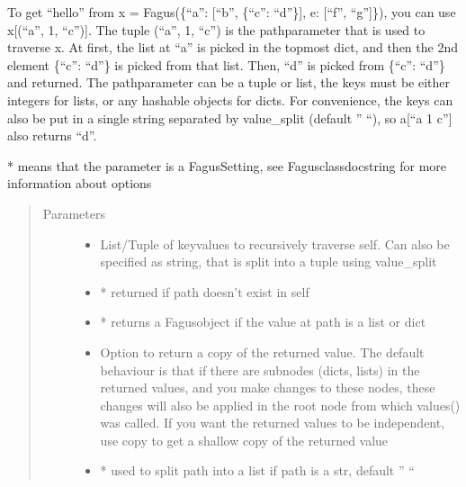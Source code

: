 \documentclass[a4paper,10pt,english]{sphinxmanual}
\begin{document}
\begin{fulllineitems}
\begin{fulllineitems}
\sphinxAtStartPar
To get “hello” from x = Fagus(\{“a”: {[}“b”, \{“c”: “d”\}{]}, e: {[}“f”, “g”{]}\}), you can use x{[}(“a”, 1, “c”){]}. The tuple
(“a”, 1, “c”) is the path\sphinxhyphen{}parameter that is used to traverse x. At first, the list at “a” is picked in the
top\sphinxhyphen{}most dict, and then the 2nd element \{“c”: “d”\} is picked from that list. Then, “d” is picked from \{“c”: “d”\}
and returned. The path\sphinxhyphen{}parameter can be a tuple or list, the keys must be either integers for lists, or any
hashable objects for dicts. For convenience, the keys can also be put in a single string separated by
value\_split (default ” “), so a{[}“a 1 c”{]} also returns “d”.

\sphinxAtStartPar
* means that the parameter is a Fagus\sphinxhyphen{}Setting, see Fagus\sphinxhyphen{}class\sphinxhyphen{}docstring for more information about options
\begin{quote}\begin{description}
\item[{Parameters}] \leavevmode\begin{itemize}
\item {}
\sphinxAtStartPar
{} \textendash{} List/Tuple of key\sphinxhyphen{}values to recursively traverse self. Can also be specified as string, that is split
into a tuple using value\_split

\item {}
\sphinxAtStartPar
{} \textendash{} * returned if path doesn’t exist in self

\item {}
\sphinxAtStartPar
{} \textendash{} * returns a Fagus\sphinxhyphen{}object if the value at path is a list or dict

\item {}
\sphinxAtStartPar
{} \textendash{} Option to return a copy of the returned value. The default behaviour is that if there are subnodes
(dicts, lists) in the returned values, and you make changes to these nodes, these changes will also be
applied in the root node from which values() was called. If you want the returned values to be
independent, use copy to get a shallow copy of the returned value

\item {}
\sphinxAtStartPar
{} \textendash{} * used to split path into a list if path is a str, default ” “


\end{itemize}
\end{description}
\end{quote}
\end{fulllineitems}
\end{fulllineitems}
\end{document}
